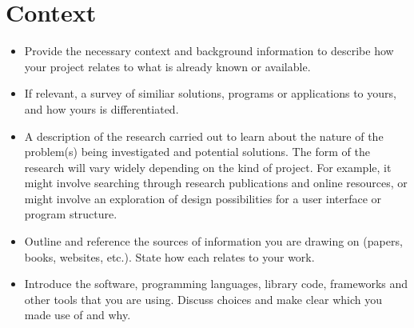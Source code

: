 \section{Context}
\label{sec:context}

\begin{itemize}
	\item Provide the necessary context and background information to describe how your project relates to what is already known or available.
	\item If relevant, a survey of similiar solutions, programs or applications to yours, and how yours is differentiated.
	\item A description of the research carried out to learn about the nature of the problem(s) being investigated and potential solutions. The form of the research will vary widely depending on the kind of project. For example, it might involve searching through research publications and online resources, or might involve an exploration of design possibilities for a user interface or program structure.
	\item Outline and reference the sources of information you are drawing on (papers, books, websites, etc.). State how each relates to your work.
	\item Introduce the software, programming languages, library code, frameworks and other tools that you are using. Discuss choices and make clear which you made use of and why.
\end{itemize}
